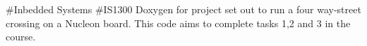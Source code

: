 \#\+Inbedded Systems \#\+IS1300 Doxygen for project set out to run a four way-\/street crossing on a Nucleon board. This code aims to complete tasks 1,2 and 3 in the course. 